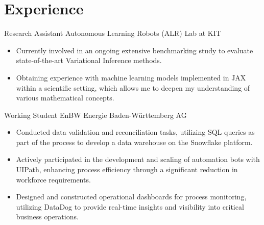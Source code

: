 \documentclass[11pt, letterpaper]{moderncv}
\newcommand{\de}[1]{}
\newcommand{\en}[1]{#1}
\newcommand{\de}[1]{#1}
\newcommand{\en}[1]{}
\begin{document}
\section{\en{Experience}\de{Berufserfahrung}}
\cventry{08.2023-\en{current}\de{heute}}
        {\en{Research Assistant}\de{Wissenschaftlicher Mitarbeiter}}
        {\en{Autonomous Learning Robots (ALR) Lab at KIT}\de{Autonome Lernende Roboter (ALR) am KIT}}
        {}
        {}
        {\en{
        \begin{itemize}
            \item Currently involved in an ongoing extensive benchmarking study to evaluate state-of-the-art Variational Inference methods.
            \item Obtaining experience with machine learning models implemented in JAX within a scientific setting, which allows me to deepen my understanding of various mathematical concepts.
        \end{itemize}}
        \de{
        \begin{itemize}
            \item Derzeit beteiligt an einer umfassenden Benchmarking-Studie zur Bewertung modernster Techniken Variational Inference. 
        \end{itemize}}
        }
        {\en{Working Student}\de{Werkstudent}}
        {EnBW Energie Baden-Württemberg AG}
        {}
        {}
        {\en{
        \begin{itemize}
            \item Conducted data validation and reconciliation tasks, utilizing SQL queries as part of the process to develop a data warehouse on the Snowflake platform.
            \item Actively participated in the development and scaling of automation bots with UIPath, enhancing process efficiency through a significant reduction in workforce requirements.
            \item Designed and constructed operational dashboards for process monitoring, utilizing DataDog to provide real-time insights and visibility into critical business operations.
        \end{itemize}}
        \de{
        \begin{itemize}
            \item Durchführung von Datenvalidierungs- und Abgleichsaufgaben unter Verwendung von SQL-Abfragen als Teil des Prozesses zur Entwicklung eines Data Warehouse auf der Snowflake-Plattform.
            \item Aktive Beteiligung an der Entwicklung und Skalierung von Automatisierungsrobotern mit UIPath zur Verbesserung der Prozesseffizienz und Workflow-Automatisierung.
            \item Entwicklung und Erstellung von operativen Dashboards für die Prozessüberwachung unter Verwendung von DataDog, um Echtzeiteinblicke und Einblicke in kritische Geschäftsvorgänge zu ermöglichen.
        \end{itemize}}
        }
\end{document}
